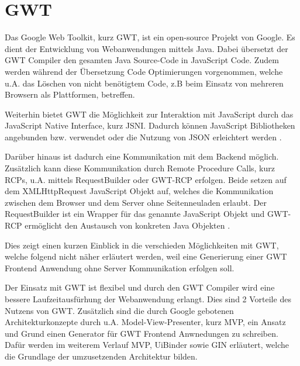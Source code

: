 \section{GWT}
\label{GWT}
Das Google Web Toolkit, kurz GWT, ist ein open-source Projekt von Google. Es
dient der Entwicklung von Webanwendungen mittels Java. Dabei übersetzt der GWT
Compiler den gesamten Java Source-Code in JavaScript Code.
Zudem werden während der Übersetzung Code Optimierungen vorgenommen, welche u.A.
das Löschen von nicht benötigtem Code, z.B beim Einsatz von mehreren
Browsern als Plattformen, betreffen. 

Weiterhin bietet GWT die Möglichkeit zur Interaktion mit JavaScript durch
das JavaScript Native Interface, kurz JSNI.
Dadurch können JavaScript Bibliotheken angebunden bzw. verwendet oder die
Nutzung von JSON erleichtert werden \cite[S. 4-9]{bib:GWTinAction}\cite[S.
237-238]{bib:GWToReilly}.

Darüber hinaus ist dadurch eine Kommunikation mit dem Backend
möglich. Zusätzlich kann diese Kommunikation durch Remote Procedure Calls,
kurz RCPs, u.A. mittels RequestBuilder oder GWT-RCP erfolgen. Beide setzen auf
dem XMLHttpRequest JavaScript Objekt auf, welches die Kommunikation zwischen dem
Browser und dem Server ohne Seitenneuladen erlaubt. Der RequestBuilder ist ein
Wrapper für das genannte JavaScript Objekt und GWT-RCP ermöglicht den Austausch
von konkreten Java Objekten \cite[S. 16]{bib:GWTinAction}\cite[S.
222]{bib:GWToReilly}.

Dies zeigt einen kurzen Einblick in die verschieden Möglichkeiten mit
GWT, welche folgend nicht näher erläutert werden, weil eine Generierung einer
GWT Frontend Anwendung ohne Server Kommunikation erfolgen soll.

Der Einsatz mit GWT ist flexibel und durch den GWT Compiler wird 
eine bessere Laufzeitausfürhung der Webanwendung erlangt\cite{bib:GWTStarted}.
Dies sind 2 Vorteile des Nutzens von GWT. Zusätzlich sind die durch Google
gebotenen Architekturkonzepte durch u.A. Model-View-Presenter, kurz MVP, ein
Ansatz und Grund einen Generator für GWT Frontend Anwnedungen zu schreiben.
Dafür werden im weiterem Verlauf MVP, UiBinder sowie GIN erläutert, welche die
Grundlage der umzusetzenden Architektur bilden.

